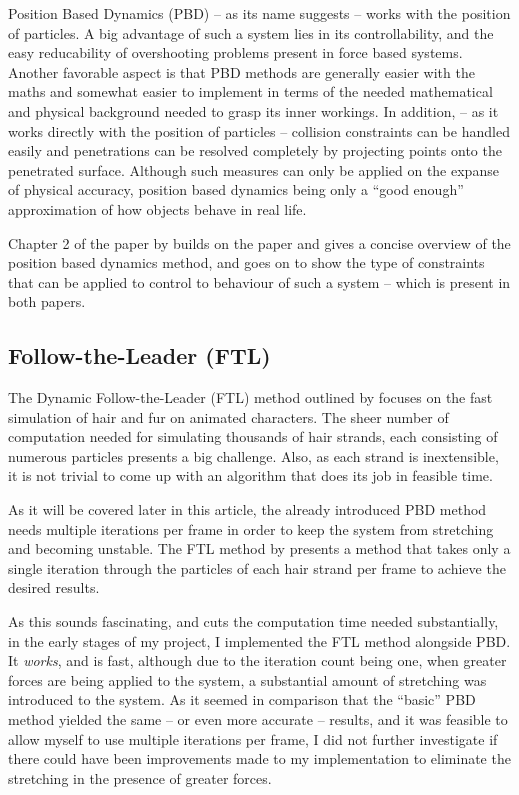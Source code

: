 \documentclass[sigplan,screen,nonacm]{acmart}
\begin{document}
Position Based Dynamics (PBD) -- as its name suggests -- works with the position
of particles. A big advantage of such a system lies in its controllability, and
the easy reducability of overshooting problems present in force based systems.
Another favorable aspect is that PBD methods are generally easier with the maths
and somewhat easier to implement in terms of the needed mathematical and
physical background needed to grasp its inner workings. In addition, -- as it
works directly with the position of particles -- collision constraints can be
handled easily and penetrations can be resolved completely by projecting points
onto the penetrated surface. Although such measures can only be applied on the
expanse of physical accuracy, position based dynamics being only a ``good
enough'' approximation of how objects behave in real life.

Chapter 2 of the paper by \citet{UmenhofferSimulation} builds on the
\citet{MullerPBD} paper and gives a concise overview of the position based
dynamics method, and goes on to show the type of constraints that can be applied
to control to behaviour of such a system -- which is present in both papers.


\subsection{Follow-the-Leader (FTL)}
The Dynamic Follow-the-Leader (FTL) method outlined by \citet{FTLHair} focuses
on the fast simulation of hair and fur on animated characters. The sheer number
of computation needed for simulating thousands of hair strands, each consisting
of numerous particles presents a big challenge. Also, as each strand is
inextensible, it is not trivial to come up with an algorithm that does its job
in feasible time. 

As it will be covered later in this article, the already introduced PBD method
needs multiple iterations per frame in order to keep the system from stretching
and becoming unstable. The FTL method by \citet{FTLHair} presents a method that
takes only a single iteration through the particles of each hair strand per
frame to achieve the desired results.

As this sounds fascinating, and cuts the computation time needed substantially,
in the early stages of my project, I implemented the FTL method alongside PBD.
It \textit{works}, and is fast, although due to the iteration count being one,
when greater forces are being applied to the system, a substantial amount of
stretching was introduced to the system. As it seemed in comparison that the
``basic'' PBD method yielded the same -- or even more accurate -- results, and
it was feasible to allow myself to use multiple iterations per frame, I did
not further investigate if there could have been improvements made to my
implementation to eliminate the stretching in the presence of greater forces.
\end{document}
